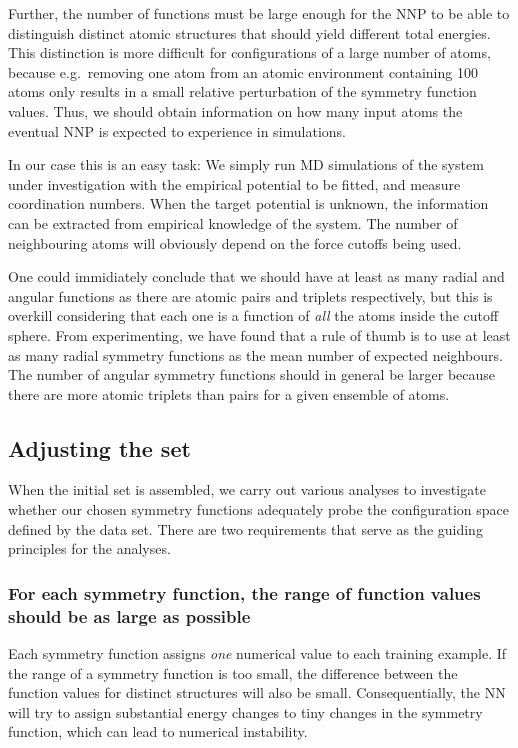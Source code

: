 \documentclass[twoside,english]{uiofysmaster}
\begin{document}
Further, the number of functions must be large enough for the NNP to be able to distinguish distinct atomic structures that
should yield different total energies. This distinction is more difficult for configurations of a large number of atoms, because
e.g.\ removing one atom from an atomic environment containing 100 atoms only results in a small relative 
perturbation of the symmetry function values. Thus, we should obtain information on how many input atoms 
the eventual NNP is expected to experience in simulations. 

In our case this is an easy task: We simply run MD simulations 
of the system under investigation with the empirical potential to be fitted, and measure coordination numbers. When the 
target potential is unknown, the information can be extracted from empirical knowledge of the system. The number of 
neighbouring atoms will obviously depend on the force cutoffs being used. 

One could immidiately conclude that we
should have at least as many radial and angular functions as there are atomic pairs and triplets respectively, but this is overkill
considering that each one is a function of \textit{all} the atoms inside the cutoff sphere.
From experimenting, we have found that a rule of thumb is to use at least as many radial symmetry functions
as the mean number of expected neighbours. The number of angular symmetry functions should in general be larger because
there are more atomic triplets than pairs for a given ensemble of atoms.  


\subsection{Adjusting the set} \label{sec:adjustSymmSet}
When the initial set is assembled, we carry out various analyses to investigate whether our chosen symmetry functions 
adequately probe the configuration space defined by the data set. There are two requirements
that serve as the guiding principles for the analyses.

\subsubsection{For each symmetry function, the range of function values should be as large as possible}
Each symmetry function
assigns \textit{one} numerical value to each training example. If the range of a symmetry function is too small, 
the difference between the function values for distinct structures will also be small. Consequentially, 
the NN will try to assign substantial energy changes to tiny changes in the symmetry function, which 
can lead to numerical instability. 
\end{document}
